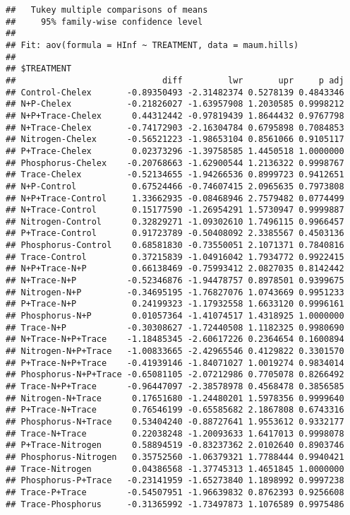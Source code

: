 \documentclass[]{article}
\begin{document}
\begin{verbatim}
##   Tukey multiple comparisons of means
##     95% family-wise confidence level
## 
## Fit: aov(formula = HInf ~ TREATMENT, data = maum.hills)
## 
## $TREATMENT
##                             diff         lwr       upr     p adj
## Control-Chelex       -0.89350493 -2.31482374 0.5278139 0.4843346
## N+P-Chelex           -0.21826027 -1.63957908 1.2030585 0.9998212
## N+P+Trace-Chelex      0.44312442 -0.97819439 1.8644432 0.9767798
## N+Trace-Chelex       -0.74172903 -2.16304784 0.6795898 0.7084853
## Nitrogen-Chelex      -0.56521223 -1.98653104 0.8561066 0.9105117
## P+Trace-Chelex        0.02373296 -1.39758585 1.4450518 1.0000000
## Phosphorus-Chelex    -0.20768663 -1.62900544 1.2136322 0.9998767
## Trace-Chelex         -0.52134655 -1.94266536 0.8999723 0.9412651
## N+P-Control           0.67524466 -0.74607415 2.0965635 0.7973808
## N+P+Trace-Control     1.33662935 -0.08468946 2.7579482 0.0774499
## N+Trace-Control       0.15177590 -1.26954291 1.5730947 0.9999887
## Nitrogen-Control      0.32829271 -1.09302610 1.7496115 0.9966457
## P+Trace-Control       0.91723789 -0.50408092 2.3385567 0.4503136
## Phosphorus-Control    0.68581830 -0.73550051 2.1071371 0.7840816
## Trace-Control         0.37215839 -1.04916042 1.7934772 0.9922415
## N+P+Trace-N+P         0.66138469 -0.75993412 2.0827035 0.8142442
## N+Trace-N+P          -0.52346876 -1.94478757 0.8978501 0.9399675
## Nitrogen-N+P         -0.34695195 -1.76827076 1.0743669 0.9951233
## P+Trace-N+P           0.24199323 -1.17932558 1.6633120 0.9996161
## Phosphorus-N+P        0.01057364 -1.41074517 1.4318925 1.0000000
## Trace-N+P            -0.30308627 -1.72440508 1.1182325 0.9980690
## N+Trace-N+P+Trace    -1.18485345 -2.60617226 0.2364654 0.1600894
## Nitrogen-N+P+Trace   -1.00833665 -2.42965546 0.4129822 0.3301570
## P+Trace-N+P+Trace    -0.41939146 -1.84071027 1.0019274 0.9834014
## Phosphorus-N+P+Trace -0.65081105 -2.07212986 0.7705078 0.8266492
## Trace-N+P+Trace      -0.96447097 -2.38578978 0.4568478 0.3856585
## Nitrogen-N+Trace      0.17651680 -1.24480201 1.5978356 0.9999640
## P+Trace-N+Trace       0.76546199 -0.65585682 2.1867808 0.6743316
## Phosphorus-N+Trace    0.53404240 -0.88727641 1.9553612 0.9332177
## Trace-N+Trace         0.22038248 -1.20093633 1.6417013 0.9998078
## P+Trace-Nitrogen      0.58894519 -0.83237362 2.0102640 0.8903746
## Phosphorus-Nitrogen   0.35752560 -1.06379321 1.7788444 0.9940421
## Trace-Nitrogen        0.04386568 -1.37745313 1.4651845 1.0000000
## Phosphorus-P+Trace   -0.23141959 -1.65273840 1.1898992 0.9997238
## Trace-P+Trace        -0.54507951 -1.96639832 0.8762393 0.9256608
## Trace-Phosphorus     -0.31365992 -1.73497873 1.1076589 0.9975486
\end{verbatim}
\end{document}
